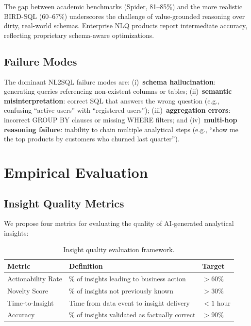\documentclass[12pt, a4paper]{article}
\begin{document}
The gap between academic benchmarks (Spider, 81--85\%) and the more realistic BIRD-SQL (60--67\%) underscores the challenge of value-grounded reasoning over dirty, real-world schemas. Enterprise NLQ products report intermediate accuracy, reflecting proprietary schema-aware optimizations.

\subsection{Failure Modes}
\begin{sloppypar}
The dominant NL2SQL failure modes are: (i)~\textbf{schema hallucination}: generating queries referencing non-existent columns or tables; (ii)~\textbf{semantic misinterpretation}: correct SQL that answers the wrong question (e.g., confusing ``active users'' with ``registered users''); (iii)~\textbf{aggregation errors}: incorrect GROUP BY clauses or missing WHERE filters; and (iv)~\textbf{multi-hop reasoning failure}: inability to chain multiple analytical steps (e.g., ``show me the top products by customers who churned last quarter'').
\end{sloppypar}

\section{Empirical Evaluation}\label{sec:evaluation}

\subsection{Insight Quality Metrics}
We propose four metrics for evaluating the quality of AI-generated analytical insights:

\begin{table}[ht]
\centering
\caption{Insight quality evaluation framework.}
\label{tab:insight-quality}
\begin{tabular}{lll}
\toprule
\textbf{Metric} & \textbf{Definition} & \textbf{Target} \\
\midrule
Actionability Rate & \% of insights leading to business action  & $>60\%$ \\
Novelty Score      & \% of insights not previously known         & $>30\%$ \\
Time-to-Insight    & Time from data event to insight delivery    & $<1$ hour \\
Accuracy           & \% of insights validated as factually correct & $>90\%$ \\
\bottomrule
\end{tabular}
\end{table}
\end{document}

